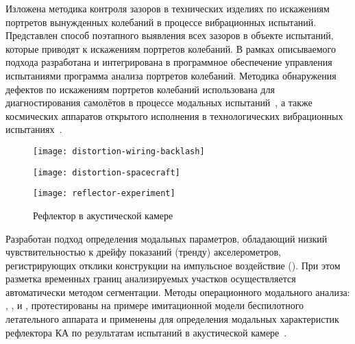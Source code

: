 Изложена методика контроля зазоров в технических изделиях по искажениям портретов вынужденных колебаний в процессе вибрационных испытаний. Представлен способ поэтапного выявления всех зазоров в объекте испытаний, которые приводят к искажениям портретов колебаний. В рамках описываемого подхода разработана и интегрирована в программное обеспечение управления испытаниями программа анализа портретов колебаний. Методика обнаружения дефектов по искажениям портретов колебаний использована для диагностирования самолётов в процессе модальных испытаний~, а также космических аппаратов открытого исполнения в технологических вибрационных испытаниях~. 

\begin{figure}[!htb]
	\centering
	\begin{minipage}{0.59\textwidth}
		\centering
		\texttt{[image: distortion-wiring-backlash]} 
		 \label{fig:distortion-wiring-backlash}
	\end{minipage}
	\hfill
	\begin{minipage}{0.4\textwidth}
		\centering
		\texttt{[image: distortion-spacecraft]}
		 \label{fig:distortion-spacecraft}
	\end{minipage}
	\vspace{0.5em}
\end{figure}

\begin{wrapfigure}[9]{r}{0.4\textwidth}
	\begin{center}
		\vspace{-1.5em}
		\texttt{[image: reflector-experiment]}
		\caption{Рефлектор в акустической камере} \label{fig:reflector-experiment}
	\end{center}
\end{wrapfigure}

Разработан подход определения модальных параметров, обладающий низкий чувствительностью к дрейфу показаний (тренду) акселерометров, регистрирующих отклики конструкции на импульсное воздействие (). При этом разметка временных границ анализируемых участков осуществляется автоматически методом сегментации. Методы операционного модального анализа: , ,  и , протестированы на примере имитационной модели беспилотного летательного аппарата и применены для определения модальных характеристик рефлектора КА по результатам испытаний в акустической камере~.

